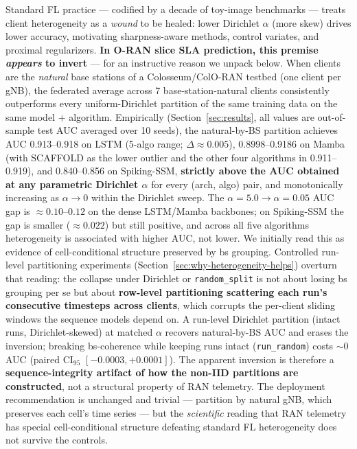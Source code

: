 \documentclass[journal]{IEEEtran}
\begin{document}
Standard FL practice --- codified by a decade of toy-image benchmarks --- treats client heterogeneity as a \emph{wound} to be healed: lower Dirichlet $\alpha$ (more skew) drives lower accuracy, motivating sharpness-aware methods, control variates, and proximal regularizers. \textbf{In O-RAN slice SLA prediction, this premise \emph{appears} to invert} --- for an instructive reason we unpack below. When clients are the \emph{natural} base stations of a Colosseum/ColO-RAN testbed (one client per gNB), the federated average across 7 base-station-natural clients consistently outperforms every uniform-Dirichlet partition of the same training data on the same model + algorithm. Empirically (Section~\ref{sec:results}, all values are out-of-sample test AUC averaged over 10 seeds), the natural-by-BS partition achieves AUC 0.913--0.918 on LSTM (5-algo range; $\Delta\approx0.005$), 0.8998--0.9186 on Mamba (with SCAFFOLD as the lower outlier and the other four algorithms in 0.911--0.919), and 0.840--0.856 on Spiking-SSM, \textbf{strictly above the AUC obtained at any parametric Dirichlet $\alpha$} for every (arch, algo) pair, and monotonically increasing as $\alpha \rightarrow 0$ within the Dirichlet sweep. The $\alpha=5.0 \rightarrow \alpha=0.05$ AUC gap is $\approx 0.10$--$0.12$ on the dense LSTM/Mamba backbones; on Spiking-SSM the gap is smaller ($\approx 0.022$) but still positive, and across all five algorithms heterogeneity is associated with higher AUC, not lower. We initially read this as evidence of cell-conditional structure preserved by bs grouping. Controlled run-level partitioning experiments (Section~\ref{sec:why-heterogeneity-helps}) overturn that reading: the collapse under Dirichlet or \texttt{random\_split} is not about losing bs grouping per se but about \textbf{row-level partitioning scattering each run's consecutive timesteps across clients}, which corrupts the per-client sliding windows the sequence models depend on. A run-level Dirichlet partition (intact runs, Dirichlet-skewed) at matched $\alpha$ recovers natural-by-BS AUC and erases the inversion; breaking bs-coherence while keeping runs intact (\texttt{run\_random}) costs ${\sim}0$ AUC (paired CI$_{95}$ $[-0.0003, +0.0001]$). The apparent inversion is therefore a \textbf{sequence-integrity artifact of how the non-IID partitions are constructed}, not a structural property of RAN telemetry. The deployment recommendation is unchanged and trivial --- partition by natural gNB, which preserves each cell's time series --- but the \emph{scientific} reading that RAN telemetry has special cell-conditional structure defeating standard FL heterogeneity does not survive the controls.
\end{document}
